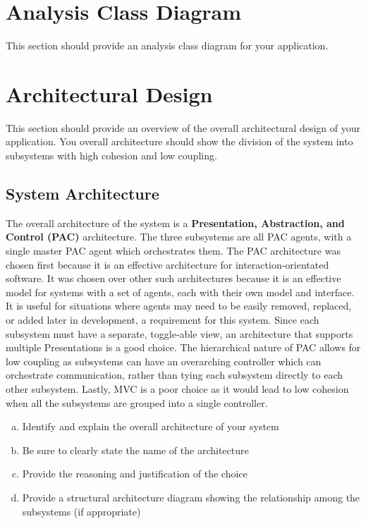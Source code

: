 \documentclass[]{article}
\begin{document}
\section{Analysis Class Diagram}
\label{sec:analysis_class_diagram}
This section should provide an analysis class diagram for your application.


\section{Architectural Design}
\label{sec:architectural_design}
This section should provide an overview of the overall architectural design of your application. You overall architecture should show the division of the system into subsystems with high cohesion and low coupling.

\subsection{System Architecture}
\label{sub:system_architecture}
The overall architecture of the system is a \textbf{Presentation, Abstraction, and Control (PAC)} architecture. The three subsystems are all PAC agents, with a single master PAC agent which orchestrates them. The PAC architecture was chosen first because it is an effective architecture for interaction-orientated software. It was chosen over other such architectures because it is an effective model for systems with a set of agents, each with their own model and interface. It is useful for situations where agents may need to be easily removed, replaced, or added later in development, a requirement for this system. Since each subsystem must have a separate, toggle-able view, an architecture that supports multiple Presentations is a good choice. The hierarchical nature of PAC allows for low coupling as subsystems can have an overarching controller which can orchestrate communication, rather than tying each subsystem directly to each other subsystem. Lastly, MVC is a poor choice as it would lead to low cohesion when all the subsystems are grouped into a single controller.
\begin{enumerate}[a)]
	\item Identify and explain the overall architecture of your system
	\item Be sure to clearly state the name of the architecture
	\item Provide the reasoning and justification of the choice
	\item Provide a structural architecture diagram showing the relationship among the subsystems (if appropriate)
\end{enumerate}
\end{document}
